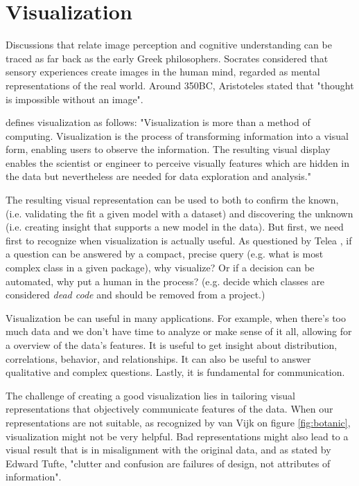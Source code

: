 \chapter{Visualization} \label{sec:visualization}

Discussions that relate image perception and cognitive understanding can be traced as far back as the early Greek philosophers. Socrates considered that sensory experiences create images in the human mind, regarded as mental representations of the real world. Around 350BC, Aristoteles stated that "thought is impossible without an image".

\citet{ref:gershon94} defines visualization as follows: "Visualization is more than a method of computing. Visualization is the process of transforming information into a visual form, enabling users to observe the information. The resulting visual display enables the scientist or engineer to perceive visually features which are hidden in the data but nevertheless are needed for data exploration and analysis."

The resulting visual representation can be used to both to confirm the known, (i.e. validating the fit a given model with a dataset) and discovering the unknown (i.e. creating insight that supports a new model in the data). But first, we need first to recognize when visualization is actually useful. As questioned by Telea%
, if a question can be answered by a compact, precise query (e.g. what is most complex class in a given package), why visualize? Or if a decision can be automated, why put a human in the process? (e.g. decide which classes are considered \textit{dead code} and should be removed from a project.)

Visualization be can useful in many applications. For example, when there's too much data and we don't have time to analyze or make sense of it all, allowing for a overview of the data's features. It is useful to get insight about distribution, correlations, behavior, and relationships. It can also be useful to answer qualitative and complex questions. Lastly, it is fundamental for communication.

The challenge of creating a good visualization lies in tailoring visual representations that objectively communicate features of the data. When our representations are not suitable, as recognized by van Vijk on figure \ref{fig:botanic}, visualization might not be very helpful. Bad representations might also lead to a visual result that is in misalignment with the original data, and as stated by Edward Tufte, "clutter and confusion are failures of design, not attributes of information".

